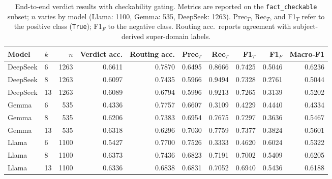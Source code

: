 \begin{table}[h]
\centering
\caption[End-to-end verdict results with checkability gating. Metrics are reported on the \texttt{fact\_checkable} subset]{End-to-end verdict results with checkability gating. Metrics are reported on the \texttt{fact\_checkable} subset; $n$ varies by model (Llama: 1100, Gemma: 535, DeepSeek: 1263). Prec$_T$, Rec$_T$, and F1$_T$ refer to the positive class (\texttt{True}); F1$_F$ to the negative class. Routing acc.\ reports agreement with subject-derived super-domain labels.}
\label{tab:appendix_e2e_gate}
\small
\begin{tabular}{llrrrrrrrr}
\hline
Model & $k$ & $n$ & Verdict acc. & Routing acc. & Prec$_T$ & Rec$_T$ & F1$_T$ & F1$_F$ & Macro-F1 \\
\hline
DeepSeek & 6  & 1263 & 0.6611 & 0.7870 & 0.6495 & 0.8666 & 0.7425 & 0.5046 & 0.6236 \\
DeepSeek & 8  & 1263 & 0.6097 & 0.7435 & 0.5966 & 0.9494 & 0.7328 & 0.2761 & 0.5044 \\
DeepSeek & 13 & 1263 & 0.6089 & 0.6794 & 0.5996 & 0.9213 & 0.7265 & 0.3139 & 0.5202 \\
\hline
Gemma    & 6  & 535  & 0.4336 & 0.7757 & 0.6607 & 0.3109 & 0.4229 & 0.4440 & 0.4334 \\
Gemma    & 8  & 535  & 0.6206 & 0.7383 & 0.6954 & 0.7675 & 0.7297 & 0.3636 & 0.5467 \\
Gemma    & 13 & 535  & 0.6318 & 0.6296 & 0.7030 & 0.7759 & 0.7377 & 0.3824 & 0.5601 \\
\hline
Llama    & 6  & 1100 & 0.5427 & 0.7700 & 0.7526 & 0.3333 & 0.4620 & 0.6024 & 0.5322 \\
Llama    & 8  & 1100 & 0.6373 & 0.7436 & 0.6823 & 0.7191 & 0.7002 & 0.5409 & 0.6205 \\
Llama    & 13 & 1100 & 0.6336 & 0.6838 & 0.6831 & 0.7052 & 0.6940 & 0.5436 & 0.6188 \\
\hline
\end{tabular}
\normalsize
\end{table}
